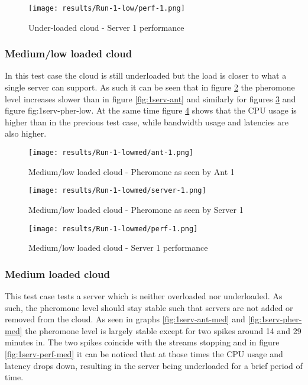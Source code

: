\begin{figure}
	\centering
		\texttt{[image: results/Run-1-low/perf-1.png]}
	\caption{Under-loaded cloud - Server 1 performance}
	\label{fig:1serv-perf}
\end{figure}

\subsubsection{Medium/low loaded cloud}

In this test case the cloud is still underloaded but the load is closer to what a single server can support. As such it can be seen that in figure \ref{fig:1serv-ant-lowmed} the pheromone level increases slower than in figure \ref{fig:1serv-ant} and similarly for figures \ref{fig:1serv-pher-lowmed} and figure {fig:1serv-pher-low}. At the same time figure  \ref{fig:1serv-perf-lowmed} shows that the CPU usage is higher than in the previous test case, while bandwidth usage and latencies are also higher.

\begin{figure}[!h]
	\centering
		\texttt{[image: results/Run-1-lowmed/ant-1.png]}
	\caption{Medium/low loaded cloud - Pheromone as seen by Ant 1}
	\label{fig:1serv-ant-lowmed}
\end{figure}

\begin{figure}
	\centering
		\texttt{[image: results/Run-1-lowmed/server-1.png]}
	\caption{Medium/low loaded cloud - Pheromone as seen by Server 1}
	\label{fig:1serv-pher-lowmed}
\end{figure}

\begin{figure}
	\centering
		\texttt{[image: results/Run-1-lowmed/perf-1.png]}
	\caption{Medium/low loaded cloud - Server 1 performance}
	\label{fig:1serv-perf-lowmed}
\end{figure}

\subsubsection{Medium loaded cloud}

This test case tests a server which is neither overloaded nor underloaded. As such, the pheromone level should stay stable such that servers are not added or removed from the cloud. As seen in graphs \ref{fig:1serv-ant-med} and \ref{fig:1serv-pher-med} the pheromone level is largely stable except for two spikes around 14 and 29 minutes in. The two spikes coincide with the streams stopping and in figure \ref{fig:1serv-perf-med} it can be noticed that at those times the CPU usage and latency drops down, resulting in the server being underloaded for a brief period of time.

